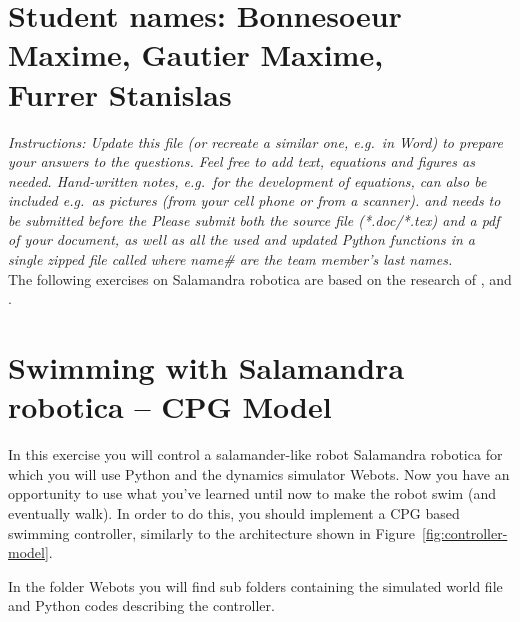 \documentclass{cmc}
\begin{document}
\pagestyle{fancy}
 

\section*{Student names: Bonnesoeur Maxime, Gautier Maxime, \\ Furrer Stanislas}

\textit{Instructions: Update this file (or recreate a similar one, e.g.\ in
  Word) to prepare your answers to the questions. Feel free to add text,
  equations and figures as needed. Hand-written notes, e.g.\ for the development
  of equations, can also be included e.g.\ as pictures (from your cell phone or
  from a scanner).  \textbf{} and needs to be
  submitted before the \textbf{} Please submit both the source
  file (*.doc/*.tex) and a pdf of your document, as well as all the used and
  updated Python functions in a single zipped file called
   where name\# are the team
  member’s last names.  }
\\

The following exercises on Salamandra robotica are based
on the research of \cite{Crespi2013}, \cite{Karakasiliotis2013} and
\cite{ijspeert2007swimming}.

\section*{Swimming with Salamandra robotica – CPG Model}
\label{sec:exploring-swimming}

In this exercise you will control a salamander-like robot Salamandra
robotica for which you will use Python and the dynamics simulator
Webots. Now you have an opportunity to use what you’ve learned until
now to make the robot swim (and eventually walk). In order to do this,
you should implement a CPG based swimming controller, similarly to the
architecture shown in Figure~\ref{fig:controller-model}.

In the folder Webots you will find sub folders containing the simulated
world file and Python codes describing the controller.
\end{document}
